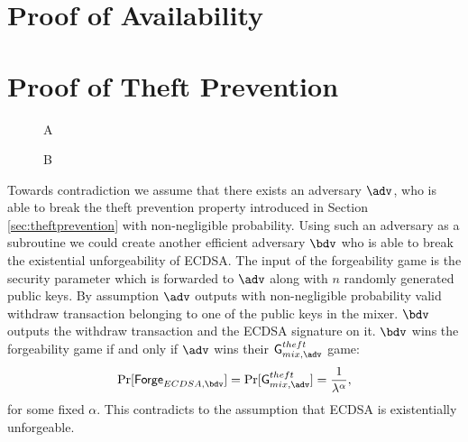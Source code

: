 \documentclass[a4paper]{article}
\theoremstyle{definition}
\begin{document}
\begin{appendices}
\section{Proof of Availability}  \label{appendavail}
\section{Proof of Theft Prevention} \label{appendtheft}

\begin{figure}
	\centering
	\begin{bbrenv}{A}
		\begin{bbrbox} [name=\bdv]
			
			\begin{bbrenv}{B}
				\begin{bbrbox}[name=\adv]
				\end{bbrbox}
				
			\end{bbrenv}
			
		\end{bbrbox}
	\end{bbrenv}
	
\end{figure}

Towards contradiction we assume that there exists an adversary $\adv$, who is able to break the theft prevention property introduced in Section \ref{sec:theftprevention} with non-negligible probability. Using such an adversary as a subroutine we could create another efficient adversary $\bdv$ who is able to break the existential unforgeability of ECDSA. The input of the forgeability game is the security parameter which is forwarded to $\adv$ along with $n$ randomly generated public keys. By assumption $\adv$ outputs with non-negligible probability valid withdraw transaction belonging to one of the public keys in the mixer. $\bdv$ outputs the withdraw transaction and the ECDSA signature on it. $\bdv$ wins the forgeability game if and only if $\adv$ wins their $\textsf{G}^{theft}_{mix,\adv}$ game:
$$\Pr[\textsf{Forge}_{ECDSA,\bdv}]=\Pr[\textsf{G}^{theft}_{mix, \adv}]=\frac{1}{\lambda^\alpha}, $$ for some fixed $\alpha$. This contradicts to the assumption that ECDSA is existentially unforgeable.      


\end{appendices}
\end{document}
